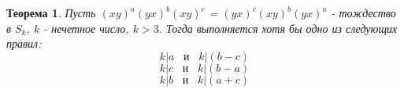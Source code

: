 \documentclass{article}
\newtheorem{theorem}{Теорема}
\begin{document}
	\begin{theorem}
		 Пусть $(xy)^a(yx)^b(xy)^c$ = $(yx)^c(xy)^b(yx)^a$ - тождество в $S_k$, $k$ - нечетное число, $k > 3$. Тогда выполняется хотя бы одно из следующих правил:
		 \begin{equation*}
		 k|a \hspace{10pt} \text{и} \hspace{10pt} k|(b-c)
		 \end{equation*}
		 \begin{equation*}
		 k|c \hspace{10pt} \text{и} \hspace{10pt} k|(b-a)
		 \end{equation*}
		 \begin{equation*}
		 k|b \hspace{10pt} \text{и} \hspace{10pt} k|(a+c)
		 \end{equation*}
	\end{theorem}
\end{document}
